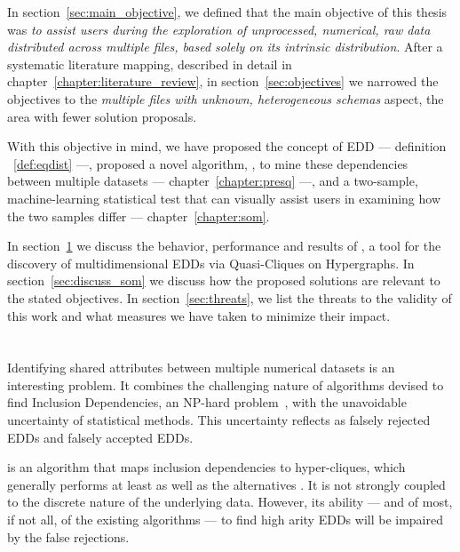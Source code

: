 \glsresetall


In section~\ref{sec:main_objective}, we defined that the main objective of this thesis
was \emph{to assist users during the exploration of unprocessed,
numerical, raw data distributed across multiple files,
based solely on its intrinsic distribution}. After a systematic literature mapping,
described in detail in chapter~\ref{chapter:literature_review}, in section~\ref{sec:objectives} we
narrowed the objectives to the \emph{multiple files with unknown, heterogeneous schemas} aspect,
the area with fewer solution proposals.

With this objective in mind, we have proposed the concept of \gls{EDD}
--- definition ~\ref{def:eqdist} ---,
proposed a novel algorithm, \PresQ, to mine these dependencies between multiple
datasets --- chapter~\ref{chapter:presq} ---, and a two-sample, machine-learning statistical
test that can visually assist users in examining how the two samples differ --- 
chapter~\ref{chapter:som}.

In section~\ref{sec:discuss_presq} we discuss the behavior, performance and results of
\PresQ, a tool for the discovery of multidimensional \glspl{EDD} via Quasi-Cliques
on Hypergraphs. In section~\ref{sec:discuss_som} we discuss how the
proposed solutions are relevant to the stated objectives. In
section~\ref{sec:threats}, we list the threats to the validity of this work and
what measures we have taken to minimize their impact.

\section{\PresQ}
\label{sec:discuss_presq}

Identifying shared attributes between multiple numerical datasets is an interesting
problem. It combines the challenging nature of algorithms devised to find Inclusion Dependencies,
an NP-hard problem~\cite{kantola1992}, with the unavoidable uncertainty of statistical
methods.
This uncertainty reflects as falsely rejected \glspl{EDD} and falsely accepted \glspl{EDD}.

\Find is an algorithm that maps inclusion dependencies to hyper-cliques,
which generally performs  at least as well as the alternatives \cite{Dursch2019}.
It is not strongly coupled to the discrete nature of the underlying data.
However, its ability --- and of most, if not all, of the existing algorithms --- to find
high arity \glspl{EDD} will be impaired by the false rejections.


